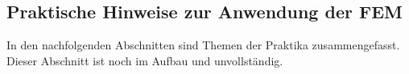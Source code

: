 \subsection{Praktische Hinweise zur Anwendung der FEM}

In den nachfolgenden Abschnitten sind Themen der Praktika zusammengefasst. Dieser Abschnitt ist noch im Aufbau und unvollständig.